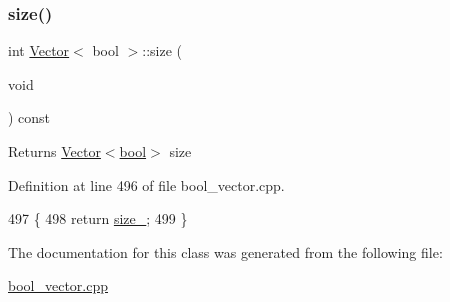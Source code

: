 \subsubsection{\texorpdfstring{size()}{size()}}
{\footnotesize\ttfamily int \hyperlink{classVector}{Vector}$<$ bool $>$\+::size (\begin{DoxyParamCaption}\item[{void}]{ }\end{DoxyParamCaption}) const}

\begin{DoxyReturn}{Returns}
\hyperlink{classVector_3_01bool_01_4}{Vector$<$bool$>$} size 
\end{DoxyReturn}


Definition at line 496 of file bool\+\_\+vector.\+cpp.


\begin{DoxyCode}
497     \{
498         \textcolor{keywordflow}{return} \hyperlink{classVector_3_01bool_01_4_a07895adb41b2c819f85640e35c0d4ae0}{size\_};
499     \}
\end{DoxyCode}


The documentation for this class was generated from the following file\+:\begin{DoxyCompactItemize}
\item 
\hyperlink{bool__vector_8cpp}{bool\+\_\+vector.\+cpp}\end{DoxyCompactItemize}

